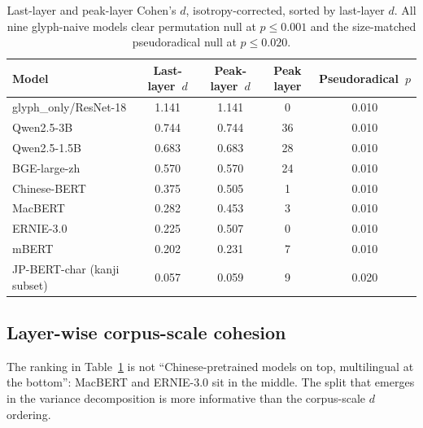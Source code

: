 \documentclass[11pt,a4paper,twocolumn]{article}
\begin{document}
\begin{table}[t!]
\centering
\caption{Last-layer and peak-layer Cohen's $d$, isotropy-corrected,
sorted by last-layer $d$. All nine glyph-naive models clear permutation
null at $p \le 0.001$ and the size-matched pseudoradical null at
$p \le 0.020$.}
\label{tab:layerwise}
\small
\setlength{\tabcolsep}{8pt}
\begin{tabular}{lcccc}
\toprule
\textbf{Model} & \textbf{Last-layer~$d$} & \textbf{Peak-layer~$d$} & \textbf{Peak layer} & \textbf{Pseudoradical~$p$} \\
\midrule
glyph\_only/ResNet-18         & 1.141 & 1.141 & 0  & 0.010 \\
Qwen2.5-3B                    & 0.744 & 0.744 & 36 & 0.010 \\
Qwen2.5-1.5B                  & 0.683 & 0.683 & 28 & 0.010 \\
BGE-large-zh                  & 0.570 & 0.570 & 24 & 0.010 \\
Chinese-BERT                  & 0.375 & 0.505 & 1  & 0.010 \\
MacBERT                       & 0.282 & 0.453 & 3  & 0.010 \\
ERNIE-3.0                     & 0.225 & 0.507 & 0  & 0.010 \\
mBERT                         & 0.202 & 0.231 & 7  & 0.010 \\
JP-BERT-char (kanji subset)   & 0.057 & 0.059 & 9  & 0.020 \\
\bottomrule
\end{tabular}
\end{table}

\subsection{Layer-wise corpus-scale cohesion}
The ranking in Table~\ref{tab:layerwise} is not ``Chinese-pretrained
models on top, multilingual at the bottom'': MacBERT and ERNIE-3.0 sit
in the middle. The split that emerges in the variance decomposition is
more informative than the corpus-scale $d$ ordering.
\end{document}
